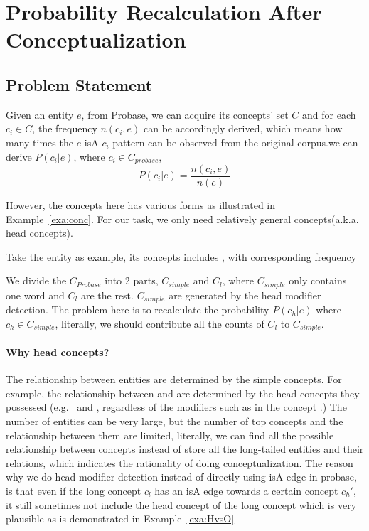 \section{Probability Recalculation After Conceptualization}
\label{sec:conceptualization}


\subsection{Problem Statement}


Given an entity $e$, from Probase, we can acquire its concepts' set $C$ and for each $c_i \in C$, the frequency $n(c_i,e)$ can be accordingly derived, which means how many times the $e$ isA $c_i$ pattern can be observed from the original corpus.we can derive $P(c_i|e)$, where $c_i \in C_{probase}$,
$$P(c_i|e)=\frac{n(c_i,e)}{n(e)}$$

However, the concepts here has various forms as illustrated in Example~\ref{exa:conc}. For our task, we only need relatively general concepts(a.k.a. head concepts).
\begin{example}
\label{exa:conc}
Take the entity  as example, its concepts includes ,  with corresponding frequency 
\end{example}

We divide the $C_{Probase}$ into 2 parts, $C_{simple}$ and $C_{l}$, where $C_{simple}$ only contains one word and $C_{l}$ are the rest.
$C_{simple}$ are generated by the head modifier detection. The problem here is to recalculate the probability $P({c_h}|e)$ where ${c_h} \in C_{simple}$, literally, we should contribute all the counts of $C_{l}$ to $C_{simple}$.


\paragraph{Why head concepts?}
The relationship between entities are determined by the simple concepts. For example, the  relationship between  and  are determined by the head concepts they possessed (e.g.\  and , regardless of the modifiers such as  in the concept .)
The number of entities can be very large, but the number of top concepts and the relationship between them are limited, literally, we can find all the possible relationship between concepts instead of store all the long-tailed entities and their relations, which indicates the rationality of doing conceptualization.
The reason why we do head modifier detection instead of directly using isA edge in probase, is that even if the long concept $c_{l}$ has an isA edge towards a certain concept ${c_h}'$, it still sometimes not include the head concept of the long concept which is very plausible as is demonstrated in Example~\ref{exa:HvsO}

